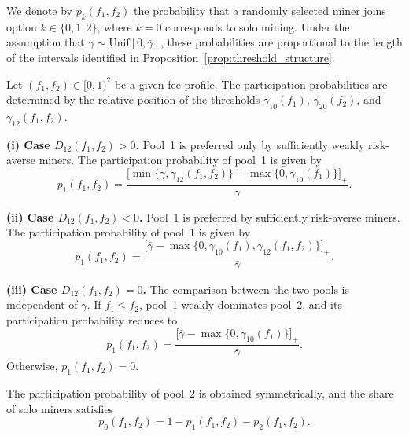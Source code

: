 We denote by $p_k(f_1,f_2)$ the probability that a randomly selected miner joins 
option $k\in\{0,1,2\}$, where $k=0$ corresponds to solo mining. Under the assumption 
that $\gamma \sim \mathrm{Unif}[0,\bar{\gamma}]$, these probabilities are proportional 
to the length of the intervals identified in Proposition~\ref{prop:threshold_structure}.

\begin{prop}\label{prop:participation_probabilities}
Let $(f_1,f_2)\in[0,1)^2$ be a given fee profile. The participation probabilities 
are determined by the relative position of the thresholds 
$\gamma_{10}(f_1)$, $\gamma_{20}(f_2)$, and $\gamma_{12}(f_1,f_2)$.

\medskip

\noindent\textbf{(i) Case $D_{12}(f_1,f_2)>0$.}  
Pool~1 is preferred only by sufficiently weakly risk-averse miners. The participation 
probability of pool~1 is given by
\begin{equation}
p_1(f_1,f_2)
=
\frac{
\big[
\min\{\bar{\gamma},\gamma_{12}(f_1,f_2)\}
-
\max\{0,\gamma_{10}(f_1)\}
\big]_+
}{\bar{\gamma}}.
\end{equation}

\medskip

\noindent\textbf{(ii) Case $D_{12}(f_1,f_2)<0$.}  
Pool~1 is preferred by sufficiently risk-averse miners. The participation probability 
of pool~1 is given by
\begin{equation}
p_1(f_1,f_2)
=
\frac{
\big[
\bar{\gamma}
-
\max\{0,\gamma_{10}(f_1),\gamma_{12}(f_1,f_2)\}
\big]_+
}{\bar{\gamma}}.
\end{equation}

\medskip

\noindent\textbf{(iii) Case $D_{12}(f_1,f_2)=0$.}  
The comparison between the two pools is independent of $\gamma$. If $f_1\le f_2$, 
pool~1 weakly dominates pool~2, and its participation probability reduces to
\begin{equation}
p_1(f_1,f_2)
=
\frac{
\big[
\bar{\gamma}
-
\max\{0,\gamma_{10}(f_1)\}
\big]_+
}{\bar{\gamma}}.
\end{equation}
Otherwise, $p_1(f_1,f_2)=0$.

\medskip

The participation probability of pool~2 is obtained symmetrically, and the share 
of solo miners satisfies
\begin{equation}
p_0(f_1,f_2)
=
1-p_1(f_1,f_2)-p_2(f_1,f_2).
\end{equation}
\end{prop}


